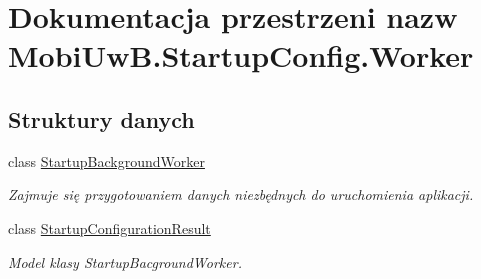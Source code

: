 \hypertarget{a00273}{}\section{Dokumentacja przestrzeni nazw Mobi\+Uw\+B.\+Startup\+Config.\+Worker}
\label{a00273}
\subsection*{Struktury danych}
\begin{DoxyCompactItemize}
\item 
class \hyperlink{a00060}{Startup\+Background\+Worker}
\begin{DoxyCompactList}\small\item\em Zajmuje się przygotowaniem danych niezbędnych do uruchomienia aplikacji. \end{DoxyCompactList}\item 
class \hyperlink{a00062}{Startup\+Configuration\+Result}
\begin{DoxyCompactList}\small\item\em Model klasy Startup\+Bacground\+Worker. \end{DoxyCompactList}\end{DoxyCompactItemize}
